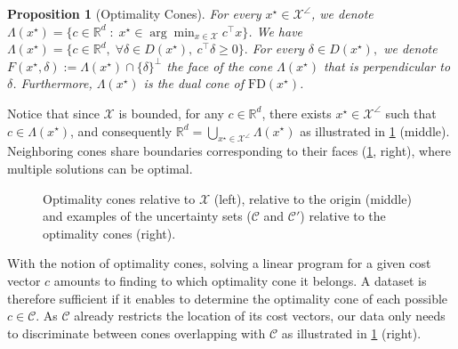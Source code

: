 \documentclass[11pt]{article}
\theoremstyle{plain}
\newtheorem{proposition}{Proposition}
\theoremstyle{definition}
\newcommand{\R}[0]{\mathbb R}
\newcommand{\FD}{\mathrm{FD}}
\newcommand{\cX}{\mathcal{X}}
\newcommand{\cC}{\mathcal{C}}
\begin{document}
\begin{proposition}[Optimality Cones]\label{optimality cone def}
    For every $x^\star\in \cX^\angle$, we denote $\Lambda(x^\star)=\{c\in \R^d \; :\; x^\star \in \arg\min_{x\in \cX}c^\top x\}$. We have 
    \(
        \Lambda(x^\star)=\{c\in \R^d,\; \forall \delta \in D(x^\star),\ c^\top \delta\geq 0\}.
    \)
    For every $\delta \in D(x^\star),$ we denote $F(x^\star,\delta):=\Lambda(x^\star)\cap \{\delta\}^\perp$ the face of the cone $\Lambda(x^\star)$ that is perpendicular to $\delta$. Furthermore, $\Lambda(x^\star)$ is the dual cone of $\FD(x^\star)$.
\end{proposition}

Notice that since $\cX$ is bounded, for any $c\in \R^d$, there exists $x^\star \in \cX^\angle$ such that $c\in \Lambda (x^\star)$, and consequently $\R^d=\bigcup_{x^\star \in \cX^\angle}\Lambda(x^\star)$ as illustrated in \cref{fig: optimality cones} (middle). Neighboring cones share boundaries corresponding to their faces (\cref{fig: optimality cones}, right), where multiple solutions can be optimal.


\begin{figure}[h] 
    \centering
    \begin{minipage}{0.33\textwidth} 
        \centering
        \end{minipage}\hfill
    \begin{minipage}{0.33\textwidth} 
        \centering
        \end{minipage}
        \begin{minipage}{0.33\textwidth} 
        \centering
        \end{minipage}\hfill
  \caption{Optimality cones relative to $\cX$ (left), relative to the origin (middle) and examples of the uncertainty sets ($\cC$ and $\cC'$) relative to the optimality cones (right).}
    \label{fig: optimality cones}
\end{figure}

With the notion of optimality cones, solving a linear program for a given cost vector $c$ amounts to finding to which optimality cone it belongs. A dataset is therefore sufficient if it enables to determine the optimality cone of each possible \(c \in \mathcal{C}\). As $\cC$ already restricts the location of its cost vectors, our data only needs to discriminate between cones overlapping with $\cC$ as illustrated in \cref{fig: optimality cones} (right).
\end{document}
